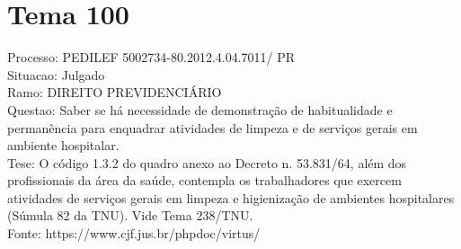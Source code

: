 \documentclass[12pt]{article}
\begin{document}
\section*{Tema 100}
Processo: PEDILEF 5002734-80.2012.4.04.7011/ PR\\
Situacao: Julgado\\
Ramo: DIREITO PREVIDENCIÁRIO\\
Questao: Saber se há necessidade de demonstração de habitualidade e permanência para enquadrar atividades de limpeza e de serviços gerais em ambiente hospitalar.\\
Tese: O código 1.3.2 do quadro anexo ao Decreto n. 53.831/64, além dos profissionais da área da saúde, contempla os trabalhadores que exercem atividades de serviços gerais em limpeza e higienização de ambientes hospitalares (Súmula 82 da TNU). Vide Tema 238/TNU.\\
Fonte: https://www.cjf.jus.br/phpdoc/virtus/
\end{document}
